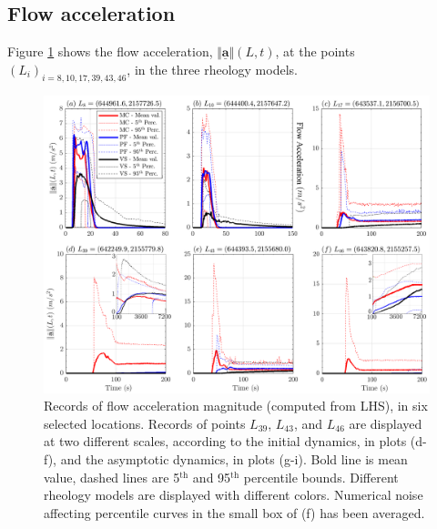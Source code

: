 \documentclass{article}
\begin{document}
\subsection{Flow acceleration}
Figure \ref{fig:Colima-Accel1} shows the flow acceleration, $\Vert \underline{\mathbf{a}} \Vert(L,t)$, at the points $(L_i)_{i=8,10,17,39,43,46}$, in the three rheology models.
\begin{figure}[H]
         \centering
        \includegraphics[width=1\textwidth]{BAF_VolcanDeColima/LocalMeasurments/Acceleration12.png}
        \caption{Records of flow acceleration magnitude (computed from LHS), in six selected locations. Records of points $L_{39}$, $L_{43}$, and $L_{46}$ are displayed at two different scales, according to the initial dynamics, in plots (d-f), and the asymptotic dynamics, in plots (g-i). Bold line is mean value, dashed lines are 5$^{\mathrm{th}}$ and 95$^{\mathrm{th}}$ percentile bounds. Different rheology models are displayed with different colors. Numerical noise affecting percentile curves in the small box of (f) has been averaged.}
        \label{fig:Colima-Accel1}
\end{figure}
\end{document}
